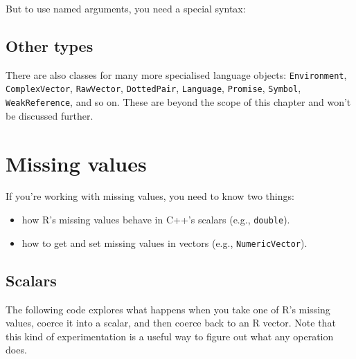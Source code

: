 But to use named arguments, you need a special syntax:

\begin{Shaded}
\begin{Highlighting}[]
\NormalTok{f(_[}\NormalTok{] = }\NormalTok{, _[}\NormalTok{] = }\NormalTok{);}
\end{Highlighting}
\end{Shaded}

\hypertarget{other-types}{%
\subsection{Other types}\label{other-types}}

There are also classes for many more specialised language objects:
\texttt{Environment}, \texttt{ComplexVector}, \texttt{RawVector},
\texttt{DottedPair}, \texttt{Language}, \texttt{Promise},
\texttt{Symbol}, \texttt{WeakReference}, and so on. These are beyond the
scope of this chapter and won't be discussed further.

\hypertarget{rcpp-na}{%
\section{Missing values}\label{rcpp-na}}

If you're working with missing values, you need to know two things:

\begin{itemize}
\tightlist
\item
  how R's missing values behave in C++'s scalars (e.g.,
  \texttt{double}).
\item
  how to get and set missing values in vectors (e.g.,
  \texttt{NumericVector}).
\end{itemize}

\hypertarget{scalars}{%
\subsection{Scalars}\label{scalars}}

The following code explores what happens when you take one of R's
missing values, coerce it into a scalar, and then coerce back to an R
vector. Note that this kind of experimentation is a useful way to figure
out what any operation does.

\begin{Shaded}
\begin{Highlighting}[]
 


\NormalTok{\}}
\end{Highlighting}
\end{Shaded}


